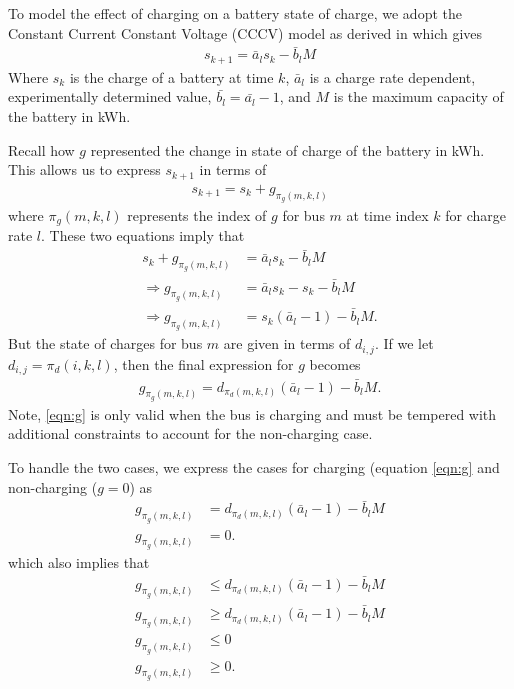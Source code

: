 \par To model the effect of charging on a battery state of charge, we adopt the Constant Current Constant Voltage (CCCV) model as derived in \cite{whitaker_network_2021} which gives
\begin{align}
	s_{k+1} = \bar{a}_ls_k - \bar{b}_lM 
\end{align}
Where $s_k$ is the charge of a battery at time $k$, $\bar{a}_l$ is a charge rate dependent, experimentally determined value, $\bar{b_l} = \bar{a_l} - 1$, and $M$ is the maximum capacity of the battery in kWh.  
\par Recall how $g$ represented the change in state of charge of the battery in kWh.  This allows us to express $s_{k+1}$ in terms of 
\begin{align}
	s_{k+1} = s_k + g_{\pi_g(m,k,l)}
\end{align}
where $\pi_g(m,k,l)$ represents the index of $g$ for bus $m$ at time index $k$ for charge rate $l$.  These two equations imply that
\begin{equation}
\begin{aligned}
	s_k + g_{\pi_g(m,k,l)} &= \bar{a}_ls_k - \bar{b}_lM \\
\Rightarrow g_{\pi_g(m,k,l)} &=  \bar{a}_ls_k - s_k - \bar{b}_lM \\
\Rightarrow g_{\pi_g(m,k,l)} &=  s_k(\bar{a}_l - 1) - \bar{b}_lM.
\end{aligned}
\end{equation}
But the state of charges for bus $m$ are given in terms of $d_{i,j}$.  If we let $d_{i,j} = \pi_d(i,k,l)$, then the final expression for $g$ becomes
\begin{align}\label{eqn:g}
	g_{\pi_g(m,k,l)} = d_{\pi_d(m,k,l)}(\bar{a}_l - 1) - \bar{b}_lM.
\end{align}
Note, \ref{eqn:g} is only valid when the bus is charging and must be tempered with additional constraints to account for the non-charging case.
\par To handle the two cases, we express the cases for charging (equation \ref{eqn:g} and non-charging ($g=0$) as  
\begin{equation}
\begin{aligned}
	g_{\pi_g(m,k,l)}  &= d_{\pi_d(m,k,l)}(\bar{a}_l - 1) - \bar{b}_lM \\
	g_{\pi_g(m,k,l)} &= 0.
\end{aligned}
\end{equation}
which also implies that
\begin{equation}\label{eqn:gTwoConst}
\begin{aligned}
	g_{\pi_g(m,k,l)}  &\le d_{\pi_d(m,k,l)}(\bar{a}_l - 1) - \bar{b}_lM \\
	g_{\pi_g(m,k,l)}  &\ge d_{\pi_d(m,k,l)}(\bar{a}_l - 1) - \bar{b}_lM \\
	g_{\pi_g(m,k,l)} &\le 0 \\
	g_{\pi_g(m,k,l)} &\ge 0.
\end{aligned}
\end{equation}
